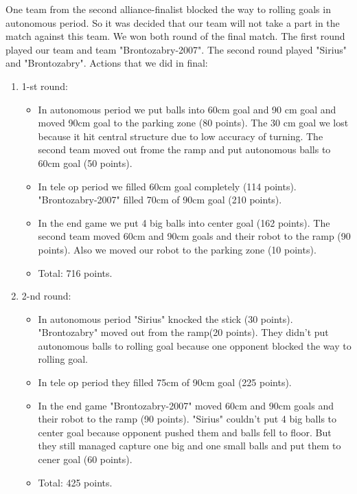One team from the second alliance-finalist blocked the way to rolling goals in autonomous period. So it was decided that our team will not take a part in the match against this team. We won both round of the final match. The first round played our team and team "Brontozabry-2007". The second round played "Sirius" and "Brontozabry".\newline
Actions that we did in final:
\begin{enumerate}
	\item 1-st round:
	\begin{itemize}
		\item In autonomous period we put balls into 60cm goal and 90 cm goal and moved 90cm goal to the parking zone (80 points). The 30 cm goal we lost because it hit central structure due to low accuracy of turning. The second team moved out frome the ramp and put autonomous balls to 60cm goal (50 points).
		
		\item In tele op period we filled 60cm goal completely (114 points). "Brontozabry-2007" filled 70cm of 90cm goal (210 points).
		
		\item In the end game we put 4 big balls into center goal (162 points). The second team moved 60cm and 90cm goals and their robot to the ramp (90 points). Also we moved our robot to the parking zone (10 points).
		
		\item Total: 716 points.
	\end{itemize}
		\item 2-nd round:
		\begin{itemize}
			\item In autonomous period "Sirius" knocked the stick (30 points). "Brontozabry" moved out from the ramp(20 points). They didn't put autonomous balls to rolling goal because one opponent blocked the way to rolling goal.
			
			\item In tele op period they filled 75cm of 90cm goal (225 points).
			
			\item In the end game "Brontozabry-2007" moved 60cm and 90cm goals and their robot to the ramp (90 points). "Sirius" couldn't put 4 big balls to center goal because opponent pushed them and balls fell to floor. But they still managed capture one big and one small balls and put them to cener goal (60 points).
			
			\item Total: 425 points.
		\end{itemize}
\end{enumerate}


